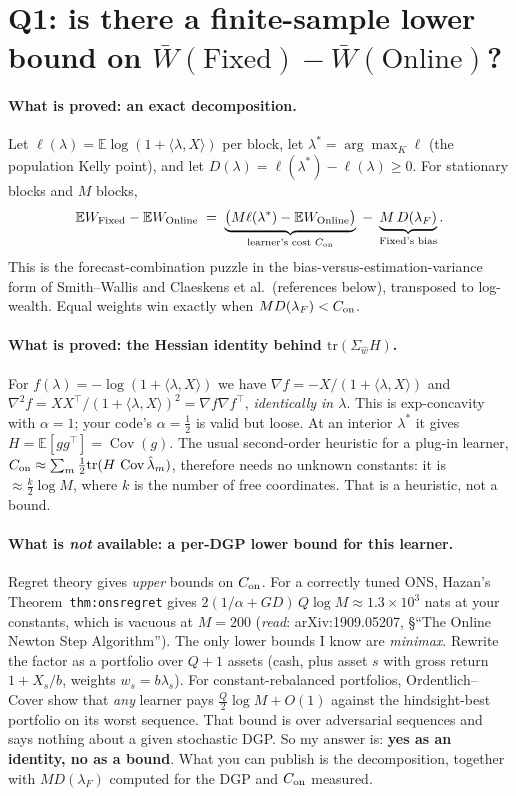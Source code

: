 \documentclass[11pt]{article}
\newcommand{\E}{\mathbb{E}}
\newcommand{\Cov}{\operatorname{Cov}}
\begin{document}
\section{Q1: is there a finite-sample lower bound on $\bar W(\mathrm{Fixed})-\bar W(\mathrm{Online})$?}
\paragraph{What is proved: an exact decomposition.}
Let $\ell(\lambda)=\E\log(1+\langle\lambda,X\rangle)$ per block, let $\lambda^\ast=\arg\max_K\ell$ (the population Kelly point), and let $D(\lambda)=\ell(\lambda^\ast)-\ell(\lambda)\ge0$. For stationary blocks and $M$ blocks,
\[
\E W_{\rm Fixed}-\E W_{\rm Online}\;=\;\underbrace{\big(M\ell(\lambda^\ast)-\E W_{\rm Online}\big)}_{\text{learner's cost }C_{\rm on}}\;-\;\underbrace{M\,D(\lambda_F)}_{\text{Fixed's bias}} .
\]
This is the forecast-combination puzzle in the bias-versus-estimation-variance form of Smith--Wallis and Claeskens et al.\ (references below), transposed to log-wealth. Equal weights win exactly when $M D(\lambda_F)<C_{\rm on}$.
\paragraph{What is proved: the Hessian identity behind $\mathrm{tr}(\Sigma_{\hat w}H)$.}
For $f(\lambda)=-\log(1+\langle\lambda,X\rangle)$ we have $\nabla f=-X/(1+\langle\lambda,X\rangle)$ and $\nabla^2 f=XX^\top/(1+\langle\lambda,X\rangle)^2=\nabla f\nabla f^\top$, \emph{identically in $\lambda$}. This is exp-concavity with $\alpha=1$; your code's $\alpha=\tfrac12$ is valid but loose. At an interior $\lambda^\ast$ it gives $H=\E[gg^\top]=\Cov(g)$. The usual second-order heuristic for a plug-in learner, $C_{\rm on}\approx\sum_m\tfrac12\mathrm{tr}(H\,\Cov\hat\lambda_m)$, therefore needs no unknown constants: it is $\approx\tfrac k2\log M$, where $k$ is the number of free coordinates. That is a heuristic, not a bound.
\paragraph{What is \emph{not} available: a per-DGP lower bound for this learner.}
Regret theory gives \emph{upper} bounds on $C_{\rm on}$. For a correctly tuned ONS, Hazan's Theorem~\texttt{thm:onsregret} gives $2(1/\alpha+GD)\,Q\log M\approx 1.3\times10^3$ nats at your constants, which is vacuous at $M=200$ (\emph{read}: arXiv:1909.05207, \S``The Online Newton Step Algorithm''). The only lower bounds I know are \emph{minimax}. Rewrite the factor as a portfolio over $Q+1$ assets (cash, plus asset $s$ with gross return $1+X_s/b$, weights $w_s=b\lambda_s$). For constant-rebalanced portfolios, Ordentlich--Cover show that \emph{any} learner pays $\tfrac Q2\log M+O(1)$ against the hindsight-best portfolio on its worst sequence. That bound is over adversarial sequences and says nothing about a given stochastic DGP. So my answer is: \textbf{yes as an identity, no as a bound}. What you can publish is the decomposition, together with $M D(\lambda_F)$ computed for the DGP and $C_{\rm on}$ measured.
\end{document}
